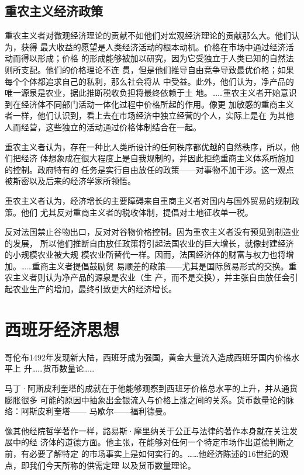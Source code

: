 \subsection{重农主义经济政策}

重农主义者对微观经济理论的贡献不如他们对宏观经济理论的贡献那么大。他们认为，获得
最大收益的愿望是人类经济活动的根本动机。价格在市场中通过经济活动而得以形成；价格
的形成能够被加以研究，因为它受独立于人类已知的自然法则所支配。他们的价格理论不连
贯，但是他们推导自由竞争导致最优价格；如果每个个体都追求自己的私利，那么社会将从
中受益。此外，他们认为，净产品的唯一源泉是农业，据此推断税收负担将最终依赖于土
地。……重农主义者开始意识到在经济体不同部门活动一体化过程中价格所起的作用。像更
加敏感的重商主义者一样，他们认识到，看上去在市场经济中独立经营的个人，实际上是在
为其他人而经营，这些独立的活动通过价格体制结合在一起。

重农主义者认为，存在一种比人类所设计的任何秩序都优越的自然秩序，所以，他们把经济
体想象成在很大程度上是自我规制的，并因此拒绝重商主义体系所施加的控制。政府特有的
任务是实行自由放任的政策——对事物不加干涉。这一观点被斯密以及后来的经济学家所领悟。

重农主义者认为，经济增长的主要障碍来自重商主义者对国内与国外贸易的规制政策。他们
尤其反对重商主义者的税收体制，提倡对土地征收单一税。

反对法国禁止谷物出口，反对对谷物价格控制。因为重农主义者没有预见到制造业的发展，
所以他们推断自由放任政策将引起法国农业的巨大增长，就像封建经济的小规模农业被大规
模农业所替代一样。因而，法国经济体的财富与权力也将增加。……重商主义者提倡鼓励贸
易顺差的政策——尤其是国际贸易形式的交换。重农主义者则认为净产品的源泉是农业（生
产，而不是交换），并主张自由放任会引起农业生产的增加，最终引致更大的经济增长。

\section{西班牙经济思想}

哥伦布1492年发现新大陆，西班牙成为强国，黄金大量流入造成西班牙国内价格水平上
升……货币数量论……

马丁·阿斯皮利奎塔的成就在于他能够观察到西班牙价格总水平的上升，并从通货膨胀很多
可能的原因中抽象出金银流入与价格上涨之间的关系。货币数量论的脉络：阿斯皮利奎塔——
马歇尔——福利德曼。

像其他经院哲学著作一样，路易斯·摩里纳关于公正与法律的著作本身就在关注发展中的经
济体的道德方面。他主张，在能够对任何一个特定市场作出道德判断之前，有必要了解特定
的市场事实上是如何实行的。……他经济陈述的16世纪的观点，即我们今天所称的供需定理
以及货币数量理论。

